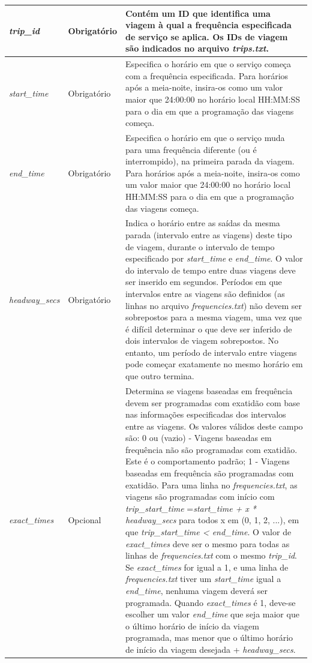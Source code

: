 \documentclass[
	12pt,				%
	oneside,			%
	a4paper,			%
	english,			%
	brazil				%
	]{abntex2ppgsi}
\begin{document}
{{\begin{apendicesenv}
\begin{longtable}[!htb]{>{\centering\arraybackslash}m{3.8cm} | >{\centering}m{2.5cm} | >{\centering\arraybackslash}m{8.5cm}}
\hline 
\textit{trip\_id} & Obrigatório & Contém um ID que identifica uma viagem à qual a frequência especificada de serviço se aplica. Os IDs de viagem são indicados no arquivo \textit{trips.txt}. \\
\hline 
\textit{start\_time} & Obrigatório & Especifica o horário em que o serviço começa com a frequência especificada. Para horários após a meia-noite, insira-os como um valor maior que 24:00:00 no horário local HH:MM:SS para o dia em que a programação das viagens começa. \\
\hline 
\textit{end\_time} & Obrigatório & Especifica o horário em que o serviço muda para uma frequência diferente (ou é interrompido), na primeira parada da viagem. Para horários após a meia-noite, insira-os como um valor maior que 24:00:00 no horário local HH:MM:SS para o dia em que a programação das viagens começa. \\
\hline 
\textit{headway\_secs} & Obrigatório & Indica o horário entre as saídas da mesma parada (intervalo entre as viagens) deste tipo de viagem, durante o intervalo de tempo especificado por \textit{start\_time} e \textit{end\_time}. O valor do intervalo de tempo entre duas viagens deve ser inserido em segundos. Períodos em que intervalos entre as viagens são definidos (as linhas no arquivo \textit{frequencies.txt}) não devem ser sobrepostos para a mesma viagem, uma vez que é difícil determinar o que deve ser inferido de dois intervalos de viagem sobrepostos. No entanto, um período de intervalo entre viagens pode começar exatamente no mesmo horário em que outro termina. \\
\hline 
\textit{exact\_times} & Opcional & Determina se viagens baseadas em frequência devem ser programadas com exatidão com base nas informações especificadas dos intervalos entre as viagens. Os valores válidos deste campo são: 0 ou (vazio) - Viagens baseadas em frequência não são programadas com exatidão. Este é o comportamento padrão; 1 - Viagens baseadas em frequência são programadas com exatidão. Para uma linha no\textit{ frequencies.txt}, as viagens são programadas com início com \textit{trip\_start\_time} =\textit{start\_time + x * headway\_secs} para todos x em (0, 1, 2, ...), em que \textit{trip\_start\_time < end\_time}. O valor de \textit{exact\_times} deve ser o mesmo para todas as linhas de \textit{frequencies.txt} com o mesmo \textit{trip\_id}. Se \textit{exact\_times} for igual a 1, e uma linha de \textit{frequencies.txt} tiver um \textit{start\_time} igual a \textit{end\_time}, nenhuma viagem deverá ser programada. Quando \textit{exact\_times} é 1, deve-se escolher um valor \textit{end\_time} que seja maior que o último horário de início da viagem programada, mas menor que o último horário de início da viagem desejada + \textit{headway\_secs}. \\
\hline 
\end{longtable}
\vspace{-\baselineskip}


\end{apendicesenv}}}
\end{document}
